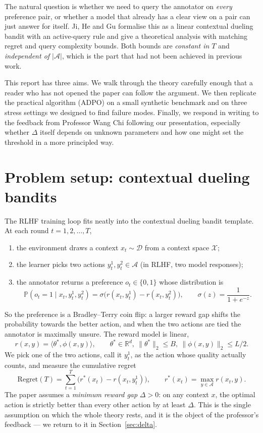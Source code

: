 \documentclass[11pt]{article}
\newcommand{\R}{\mathbb{R}}
\begin{document}
The natural question is whether we need to query the annotator on \emph{every} preference pair, or whether a model that already has a clear view on a pair can just answer for itself. Ji, He and Gu formalise this as a linear contextual dueling bandit with an active-query rule and give a theoretical analysis with matching regret and query complexity bounds. Both bounds are \emph{constant in $T$} and \emph{independent of $|\mathcal{A}|$}, which is the part that had not been achieved in previous work.

This report has three aims. We walk through the theory carefully enough that a reader who has not opened the paper can follow the argument. We then replicate the practical algorithm (ADPO) on a small synthetic benchmark and on three stress settings we designed to find failure modes. Finally, we respond in writing to the feedback from Professor Wang Chi following our presentation, especially whether $\Delta$ itself depends on unknown parameters and how one might set the threshold in a more principled way.

\section{Problem setup: contextual dueling bandits}

The RLHF training loop fits neatly into the contextual dueling bandit template. At each round $t = 1, 2, \dots, T$,
\begin{enumerate}[leftmargin=*,itemsep=1pt]
  \item the environment draws a context $x_t \sim \mathcal{D}$ from a context space $\mathcal{X}$;
  \item the learner picks two actions $y_t^1, y_t^2 \in \mathcal{A}$ (in RLHF, two model responses);
  \item the annotator returns a preference $o_t \in \{0, 1\}$ whose distribution is
  \[
    \mathbb{P}(o_t = 1 \mid x_t, y_t^1, y_t^2)
    = \sigma\bigl(r(x_t, y_t^1) - r(x_t, y_t^2)\bigr),
    \qquad \sigma(z) = \frac{1}{1 + e^{-z}}.
  \]
\end{enumerate}
So the preference is a Bradley--Terry coin flip: a larger reward gap shifts the probability towards the better action, and when the two actions are tied the annotator is maximally unsure. The reward model is linear,
\[
  r(x, y) = \langle \theta^*, \phi(x, y) \rangle,
  \qquad \theta^* \in \R^d,\ \|\theta^*\|_2 \le B,\ \|\phi(x, y)\|_2 \le L/2.
\]
We pick one of the two actions, call it $y_t^1$, as the action whose quality actually counts, and measure the cumulative regret
\[
  \mathrm{Regret}(T) = \sum_{t=1}^T \bigl( r^*(x_t) - r(x_t, y_t^1) \bigr),
  \qquad r^*(x_t) = \max_{y \in \mathcal{A}} r(x_t, y).
\]
The paper assumes a \emph{minimum reward gap} $\Delta > 0$: on any context $x$, the optimal action is strictly better than every other action by at least $\Delta$. This is the single assumption on which the whole theory rests, and it is the object of the professor's feedback --- we return to it in Section~\ref{sec:delta}.
\end{document}
